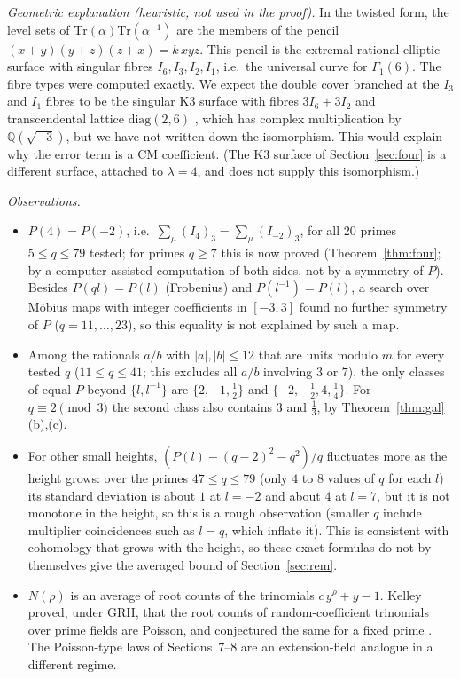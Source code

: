 \documentclass[11pt]{article}
\begin{document}
\emph{Geometric explanation (heuristic, not used in the proof).} In the twisted form, the level sets of $\mathrm{Tr}(\alpha)\mathrm{Tr}(\alpha^{-1})$ are the members of the pencil
$(x+y)(y+z)(z+x)=k\,xyz$. This pencil is the extremal rational elliptic surface with singular fibres $I_6,I_3,I_2,I_1$, i.e.\ the universal curve for $\Gamma_1(6)$.
The fibre types were computed exactly. We expect the double cover branched at the $I_3$ and $I_1$ fibres to be the singular K3 surface with fibres $3I_6+3I_2$ and transcendental
lattice $\mathrm{diag}(2,6)$ \cite{HS}, which has complex multiplication by $\mathbb Q(\sqrt{-3})$, but we have not written down the isomorphism. This would explain why the error term is a CM coefficient. (The K3 surface of Section~\ref{sec:four} is a different surface, attached to $\lambda=4$, and does not supply this isomorphism.)

\emph{Observations.}
\begin{itemize}
\item $P(4)=P(-2)$, i.e.\ $\sum_\mu(I_4)_3=\sum_\mu(I_{-2})_3$, for all 20 primes $5\le q\le79$ tested; for primes $q\ge7$ this is now proved (Theorem~\ref{thm:four}; by a computer-assisted computation of both sides, not by a symmetry of $P$). Besides $P(ql)=P(l)$ (Frobenius) and $P(l^{-1})=P(l)$, a search over M\"obius maps with integer coefficients in $[-3,3]$ found no further symmetry of $P$ ($q=11,\dots,23$), so this equality is not explained by such a map.
\item Among the rationals $a/b$ with $|a|,|b|\le12$ that are units modulo $m$ for every tested $q$ ($11\le q\le41$; this excludes all $a/b$ involving $3$ or $7$), the only classes of equal $P$ beyond $\{l,l^{-1}\}$ are $\{2,-1,\tfrac12\}$ and $\{-2,-\tfrac12,4,\tfrac14\}$. For $q\equiv2\pmod3$ the second class also contains $3$ and $\tfrac13$, by Theorem~\ref{thm:gal}(b),(c).
\item For other small heights, $(P(l)-(q-2)^2-q^2)/q$ fluctuates more as the height grows: over the primes $47\le q\le79$ (only $4$ to $8$ values of $q$ for each $l$) its standard deviation is about $1$ at $l=-2$ and about $4$ at $l=7$, but it is not monotone in the height, so this is a rough observation (smaller $q$ include multiplier coincidences such as $l=q$, which inflate it). This is consistent with cohomology that grows with the height, so these exact formulas do not by themselves give the averaged bound of Section~\ref{sec:rem}.
\item $N(\rho)$ is an average of root counts of the trinomials $c\,y^\rho+y-1$. Kelley proved, under GRH, that the root counts of random-coefficient trinomials over prime fields are Poisson, and conjectured the same for a fixed prime \cite{Ke,KO,BCR}. The Poisson-type laws of Sections~7--8 are an extension-field analogue in a different regime.
\end{itemize}
\end{document}
